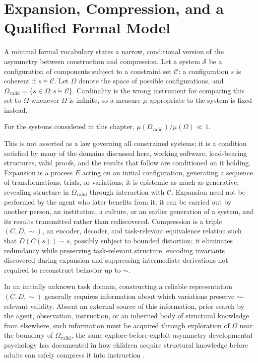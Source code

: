 \section{Expansion, Compression, and a Qualified Formal Model}

A minimal formal vocabulary states a narrow, conditional version of the asymmetry between construction and compression. Let a system $\mathcal{S}$ be a configuration of components subject to a constraint set $\mathcal{C}$; a configuration $s$ is coherent if $s \models \mathcal{C}$. Let $\Omega$ denote the space of possible configurations, and $\Omega_{\mathrm{valid}} = \{s \in \Omega : s \models \mathcal{C}\}$. Cardinality is the wrong instrument for comparing this set to $\Omega$ whenever $\Omega$ is infinite, so a measure $\mu$ appropriate to the system is fixed instead.

\begin{assumption}
For the systems considered in this chapter, $\mu(\Omega_{\mathrm{valid}})/\mu(\Omega) \ll 1$.
\end{assumption}

This is not asserted as a law governing all constrained systems; it is a condition satisfied by many of the domains discussed here, working software, load-bearing structures, valid proofs, and the results that follow are conditioned on it holding. Expansion is a process $E$ acting on an initial configuration, generating a sequence of transformations, trials, or variations; it is epistemic as much as generative, revealing structure in $\Omega_{\mathrm{valid}}$ through interaction with $\mathcal{C}$. Expansion need not be performed by the agent who later benefits from it; it can be carried out by another person, an institution, a culture, or an earlier generation of a system, and its results transmitted rather than rediscovered. Compression is a triple $(C,D,\sim)$, an encoder, decoder, and task-relevant equivalence relation such that $D(C(s)) \sim s$, possibly subject to bounded distortion; it eliminates redundancy while preserving task-relevant structure, encoding invariants discovered during expansion and suppressing intermediate derivations not required to reconstruct behavior up to $\sim$.

\begin{proposition}
\label{prop:compression-requires-expansion}
In an initially unknown task domain, constructing a reliable representation $(C,D,\sim)$ generally requires information about which variations preserve $\sim$-relevant validity. Absent an external source of this information, prior search by the agent, observation, instruction, or an inherited body of structural knowledge from elsewhere, such information must be acquired through exploration of $\Omega$ near the boundary of $\Omega_{\mathrm{valid}}$, the same explore-before-exploit asymmetry developmental psychology has documented in how children acquire structural knowledge before adults can safely compress it into instruction \cite{gopnik2020}.
\end{proposition}

